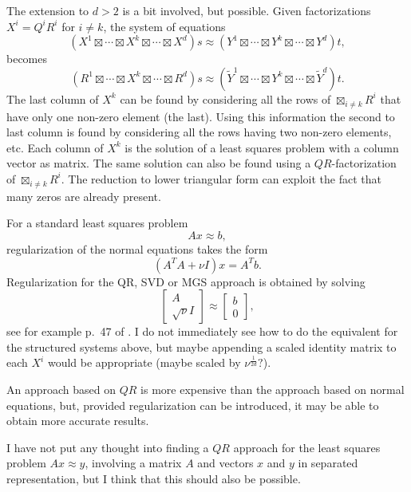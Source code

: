\documentclass[12pt]{artikel3}
\newcommand{\bigboxtimes}{\boxtimes}
\begin{document}
The extension to \(d > 2\) is a bit involved, but possible. Given
factorizations \(X^i = Q^i R^i\) for \(i \neq k\), the system of
equations
\[ ( X^1 \boxtimes \dotsb \boxtimes X^k \boxtimes \dotsb \boxtimes X^d ) s 
\approx
( Y^1 \boxtimes \dotsb \boxtimes Y^k 
\boxtimes \dotsb \boxtimes Y^d ) t,\]
becomes
\[ ( R^1 \boxtimes \dotsb \boxtimes X^k \boxtimes \dotsb \boxtimes R^d ) s 
\approx
( \tilde{Y}^1 \boxtimes \dotsb \boxtimes Y^k 
\boxtimes \dotsb \boxtimes \tilde{Y}^d ) t.\]
The last column of \(X^k\) can be found by considering all the rows of
\(\bigboxtimes_{i \neq k} R^i\) that have only one non-zero element
(the last). Using this information the second to last column is found
by considering all the rows having two non-zero elements, etc. Each column
of \(X^k\) is the solution of a least squares problem with a column
vector as matrix. The same solution can also be found using a
\(QR\)-factorization of \(\bigboxtimes_{i \neq k} R^i\). The reduction
to lower triangular form can exploit the fact that many zeros are
already present.

For a standard least squares problem
\[Ax \approx b,\]
regularization of the normal equations takes the form
\[(A^T A + \nu I) x = A^T b.\]
Regularization for the QR, SVD or MGS approach is obtained by solving
\[\left[\begin{array}{c}A \\ \sqrt{\nu} I\end{array}\right]
\approx
\left[\begin{array}{c}b \\ 0\end{array}\right],\]
see for example p.~47 of \cite{Kel99}. I do not immediately see how
to do the equivalent for the structured systems above, but maybe
appending a scaled identity matrix to each
\(X^i\) would be appropriate (maybe scaled by \(\nu^{\frac{1}{2d}}?\)).

An approach based on \(QR\) is more expensive than the approach based
on normal equations, but, provided regularization can be introduced, it
may be able to obtain more accurate results.

I have not put any thought into finding a \(QR\) approach for the
least squares problem \(A x \approx y\), involving a matrix \(A\) and
vectors \(x\) and \(y\) in separated representation, but I think that
this should also be possible.



\end{document}
